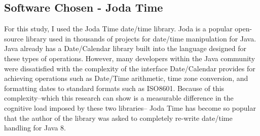 \subsection{Software Chosen - Joda Time}

For this study, I used the Joda Time date/time library. Joda is a popular open-source library used in thousands of projects for date/time manipulation for Java. Java already has a Date/Calendar library built into the language designed for these types of operations. However, many developers within the Java community were dissatisfied with the complexity of the interface Date/Calendar provides for achieving operations such as Date/Time arithmetic, time zone conversion, and formatting dates to standard formats such as ISO8601. Because of this complexity--which this research can show is a measurable difference in the cognitive load imposed by these two libraries-- Joda Time has become so popular that the author of the library was asked to completely re-write date/time handling for Java 8. 
 
